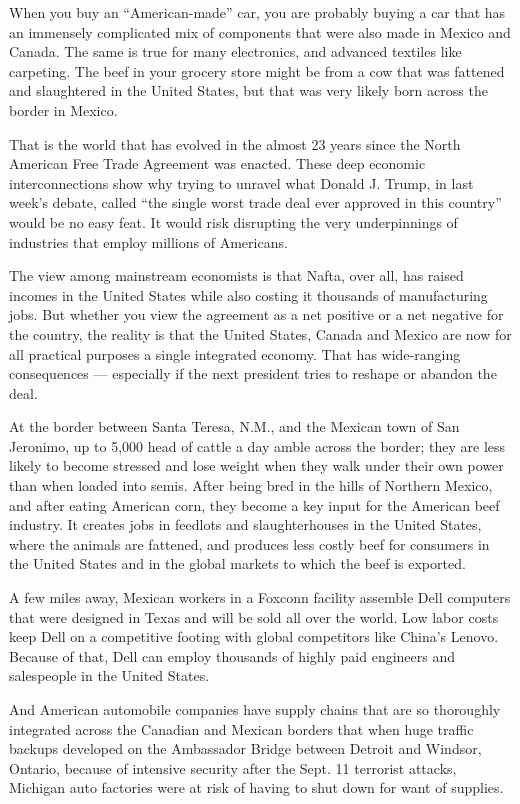 When you buy an ``American-made'' car, you are probably buying a car
that has an immensely complicated mix of components that were also made
in Mexico and Canada. The same is true for many electronics, and
advanced textiles like carpeting. The beef in your grocery store might
be from a cow that was fattened and slaughtered in the United States,
but that was very likely born across the border in Mexico.

That is the world that has evolved in the almost 23 years since the
North American Free Trade Agreement was enacted. These deep economic
interconnections show why trying to unravel what Donald J. Trump, in
last week's debate, called ``the single worst trade deal ever approved
in this country'' would be no easy feat. It would risk disrupting the
very underpinnings of industries that employ millions of Americans.

The view among mainstream economists is that Nafta, over all, has raised
incomes in the United States while also costing it thousands of
manufacturing jobs. But whether you view the agreement as a net positive
or a net negative for the country, the reality is that the United
States, Canada and Mexico are now for all practical purposes a single
integrated economy. That has wide-ranging consequences --- especially if
the next president tries to reshape or abandon the deal.

At the border between Santa Teresa, N.M., and the Mexican town of San
Jeronimo, up to 5,000 head of cattle a day amble across the border; they
are less likely to become stressed and lose weight when they walk under
their own power than when loaded into semis. After being bred in the
hills of Northern Mexico, and after eating American corn, they become a
key input for the American beef industry. It creates jobs in feedlots
and slaughterhouses in the United States, where the animals are
fattened, and produces less costly beef for consumers in the United
States and in the global markets to which the beef is exported.

A few miles away, Mexican workers in a Foxconn facility assemble Dell
computers that were designed in Texas and will be sold all over the
world. Low labor costs keep Dell on a competitive footing with global
competitors like China's Lenovo. Because of that, Dell can employ
thousands of highly paid engineers and salespeople in the United States.

And American automobile companies have supply chains that are so
thoroughly integrated across the Canadian and Mexican borders that when
huge traffic backups developed on the Ambassador Bridge between Detroit
and Windsor, Ontario, because of intensive security after the Sept. 11
terrorist attacks, Michigan auto factories were at risk of having to
shut down for want of supplies.

